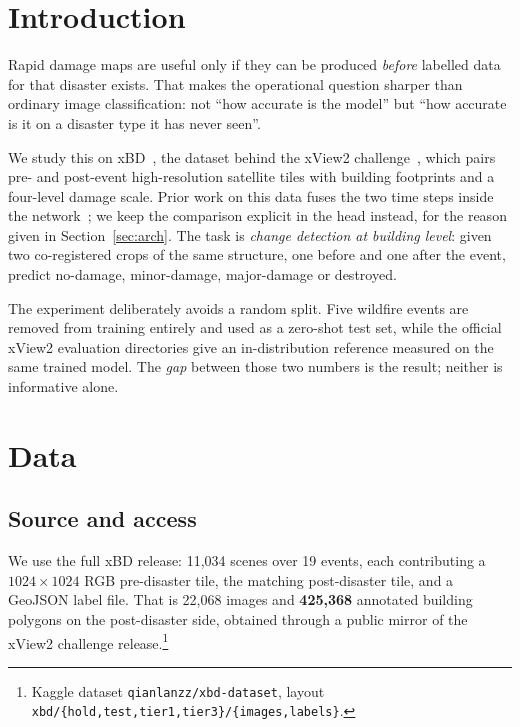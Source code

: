 \documentclass[10pt,twocolumn]{article}
\newcommand{\class}[1]{\textsf{#1}}
\begin{document}
\section{Introduction}

Rapid damage maps are useful only if they can be produced \emph{before} labelled data for that
disaster exists. That makes the operational question sharper than ordinary image classification: not
``how accurate is the model'' but ``how accurate is it on a disaster type it has never seen''.

We study this on xBD~\cite{xbd}, the dataset behind the xView2 challenge~\cite{xview2}, which pairs
pre- and post-event high-resolution satellite tiles with building footprints and a four-level damage
scale. Prior work on this data fuses the two time steps inside the network~\cite{fusion}; we keep the
comparison explicit in the head instead, for the reason given in
Section~\ref{sec:arch}. The task is \emph{change detection at
building level}: given two co-registered crops of the same structure, one before and one after the
event, predict \class{no-damage}, \class{minor-damage}, \class{major-damage} or \class{destroyed}.

The experiment deliberately avoids a random split. Five wildfire events are removed from training
entirely and used as a zero-shot test set, while the official xView2 evaluation directories give an
in-distribution reference measured on the same trained model. The \emph{gap} between those two
numbers is the result; neither is informative alone.

\section{Data}

\subsection{Source and access}

We use the full xBD release: 11,034 scenes over 19 events, each contributing a $1024\times1024$ RGB
pre-disaster tile, the matching post-disaster tile, and a GeoJSON label file. That is 22,068 images
and \textbf{425,368} annotated building polygons on the post-disaster side, obtained through a
public mirror of the xView2 challenge release.\footnote{Kaggle dataset
\texttt{qianlanzz/\allowbreak xbd-dataset}, layout
\texttt{xbd/\{hold,\allowbreak test,\allowbreak tier1,\allowbreak tier3\}/\allowbreak \{images,\allowbreak labels\}}.}
\end{document}

